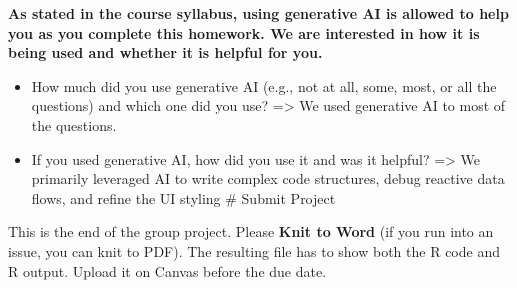 \documentclass[
]{article}
\providecommand{\tightlist}{%
  \setlength{\itemsep}{0pt}\setlength{\parskip}{0pt}}
\begin{document}
\textbf{As stated in the course syllabus, using generative AI is allowed
to help you as you complete this homework. We are interested in how it
is being used and whether it is helpful for you.}

\begin{itemize}
\tightlist
\item
  How much did you use generative AI (e.g., not at all, some, most, or
  all the questions) and which one did you use? =\textgreater{} We used
  generative AI to most of the questions.
\item
  If you used generative AI, how did you use it and was it helpful?
  =\textgreater{} We primarily leveraged AI to write complex code
  structures, debug reactive data flows, and refine the UI styling \#
  Submit Project
\end{itemize}

This is the end of the group project. Please \textbf{Knit to Word} (if
you run into an issue, you can knit to PDF). The resulting file has to
show both the R code and R output. Upload it on Canvas before the due
date.
\end{document}
